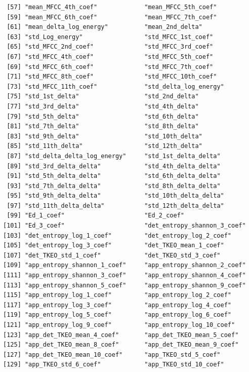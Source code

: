 \documentclass[
]{article}
\begin{document}
\begin{verbatim}
 [57] "mean_MFCC_4th_coef"             "mean_MFCC_5th_coef"            
 [59] "mean_MFCC_6th_coef"             "mean_MFCC_7th_coef"            
 [61] "mean_delta_log_energy"          "mean_2nd_delta"                
 [63] "std_Log_energy"                 "std_MFCC_1st_coef"             
 [65] "std_MFCC_2nd_coef"              "std_MFCC_3rd_coef"             
 [67] "std_MFCC_4th_coef"              "std_MFCC_5th_coef"             
 [69] "std_MFCC_6th_coef"              "std_MFCC_7th_coef"             
 [71] "std_MFCC_8th_coef"              "std_MFCC_10th_coef"            
 [73] "std_MFCC_11th_coef"             "std_delta_log_energy"          
 [75] "std_1st_delta"                  "std_2nd_delta"                 
 [77] "std_3rd_delta"                  "std_4th_delta"                 
 [79] "std_5th_delta"                  "std_6th_delta"                 
 [81] "std_7th_delta"                  "std_8th_delta"                 
 [83] "std_9th_delta"                  "std_10th_delta"                
 [85] "std_11th_delta"                 "std_12th_delta"                
 [87] "std_delta_delta_log_energy"     "std_1st_delta_delta"           
 [89] "std_3rd_delta_delta"            "std_4th_delta_delta"           
 [91] "std_5th_delta_delta"            "std_6th_delta_delta"           
 [93] "std_7th_delta_delta"            "std_8th_delta_delta"           
 [95] "std_9th_delta_delta"            "std_10th_delta_delta"          
 [97] "std_11th_delta_delta"           "std_12th_delta_delta"          
 [99] "Ed_1_coef"                      "Ed_2_coef"                     
[101] "Ed_3_coef"                      "det_entropy_shannon_3_coef"    
[103] "det_entropy_log_1_coef"         "det_entropy_log_2_coef"        
[105] "det_entropy_log_3_coef"         "det_TKEO_mean_1_coef"          
[107] "det_TKEO_std_1_coef"            "det_TKEO_std_3_coef"           
[109] "app_entropy_shannon_1_coef"     "app_entropy_shannon_2_coef"    
[111] "app_entropy_shannon_3_coef"     "app_entropy_shannon_4_coef"    
[113] "app_entropy_shannon_5_coef"     "app_entropy_shannon_9_coef"    
[115] "app_entropy_log_1_coef"         "app_entropy_log_2_coef"        
[117] "app_entropy_log_3_coef"         "app_entropy_log_4_coef"        
[119] "app_entropy_log_5_coef"         "app_entropy_log_6_coef"        
[121] "app_entropy_log_9_coef"         "app_entropy_log_10_coef"       
[123] "app_det_TKEO_mean_4_coef"       "app_det_TKEO_mean_5_coef"      
[125] "app_det_TKEO_mean_8_coef"       "app_det_TKEO_mean_9_coef"      
[127] "app_det_TKEO_mean_10_coef"      "app_TKEO_std_5_coef"           
[129] "app_TKEO_std_6_coef"            "app_TKEO_std_10_coef"          

\end{verbatim}
\end{document}
